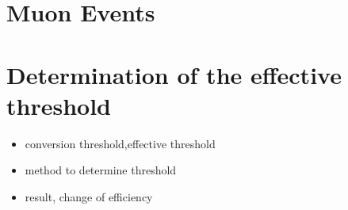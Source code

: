 \section{Muon Events}








\section{Determination of the effective threshold}


\begin{itemize}
  \item conversion threshold,effective threshold
  \item method to determine threshold
  \item result, change of efficiency
\end{itemize}

